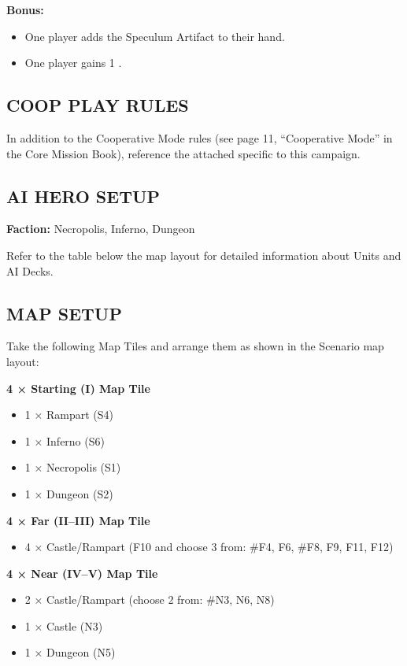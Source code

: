 \begin{multicols*}{2}
\columnbreak
\textbf{Bonus:}
\begin{itemize}
  \item One player adds the Speculum Artifact to their hand.
  \item One player gains 1 .
\end{itemize}

\subsection*{\MakeUppercase{Coop Play Rules}}

In addition to the Cooperative Mode rules (see page 11, ``Cooperative Mode'' in the Core Mission Book), reference the attached  specific to this campaign.

\subsection*{\MakeUppercase{AI Hero Setup}}

\textbf{Faction:} Necropolis, Inferno, Dungeon

Refer to the table below the map layout for detailed information about Units and AI Decks.

\subsection*{\MakeUppercase{Map Setup}}

Take the following Map Tiles and arrange them as shown in the Scenario map layout:

\textbf{4 × Starting (I) Map Tile}
\begin{itemize}
  \item 1 × Rampart (S4)
  \item 1 × Inferno (S6)
  \item 1 × Necropolis (S1)
  \item 1 × Dungeon (S2)
\end{itemize}

\textbf{4 × Far (II--III) Map Tile}
\begin{itemize}
  \item 4 × Castle/Rampart (F10 and choose 3 from: \#F4, F6, \#F8, F9, F11, F12)
\end{itemize}

\textbf{4 × Near (IV--V) Map Tile}
\begin{itemize}
  \item 2 × Castle/Rampart (choose 2 from: \#N3, N6, N8)
  \item 1 × Castle (N3)
  \item 1 × Dungeon (N5)
\end{itemize}


\end{multicols*}
